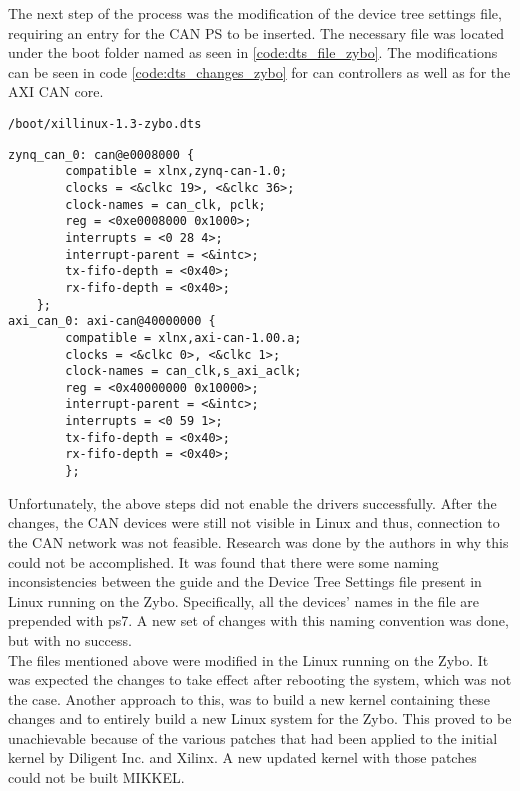 The next step of the process was the modification of the device tree settings file, requiring an entry for the CAN PS to be inserted.
The necessary file was located under the boot folder named as seen in \ref{code:dts_file_zybo}.
The modifications can be seen in code \ref{code:dts_changes_zybo} for can controllers as well as for the AXI CAN core.

\begin{lstlisting}[numbers=none,caption={Device tree settings file and its path.},label={code:dts_file_zybo}]
/boot/xillinux-1.3-zybo.dts
\end{lstlisting}
\begin{lstlisting}[caption={Device tree settings changes.},label={code:dts_changes_zybo}]
zynq_can_0: can@e0008000 {
        compatible = xlnx,zynq-can-1.0;
        clocks = <&clkc 19>, <&clkc 36>;
        clock-names = can_clk, pclk;
        reg = <0xe0008000 0x1000>;
        interrupts = <0 28 4>;
        interrupt-parent = <&intc>;
        tx-fifo-depth = <0x40>;
        rx-fifo-depth = <0x40>;
    };
axi_can_0: axi-can@40000000 {
        compatible = xlnx,axi-can-1.00.a;
        clocks = <&clkc 0>, <&clkc 1>;
        clock-names = can_clk,s_axi_aclk;
        reg = <0x40000000 0x10000>;
        interrupt-parent = <&intc>;
        interrupts = <0 59 1>;
        tx-fifo-depth = <0x40>;
        rx-fifo-depth = <0x40>;
        };
\end{lstlisting}

Unfortunately, the above steps did not enable the drivers successfully.
After the changes, the CAN devices were still not visible in Linux and thus, connection to the CAN network was not feasible.
Research was done by the authors in why this could not be accomplished.
It was found that there were some naming inconsistencies between the guide and the Device Tree Settings file present in Linux running on the Zybo. Specifically, all the devices' names in the file are prepended with ps7.
A new set of changes with this naming convention was done, but with no success.\\

The files mentioned above were modified in the Linux running on the Zybo.
It was expected the changes to take effect after rebooting the system, which was not the case.
Another approach to this, was to build a new kernel containing these changes and to entirely build a new Linux system for the Zybo.
This proved to be unachievable because of the various patches that had been applied to the initial kernel by Diligent Inc. and Xilinx.
A new updated kernel with those patches could not be built MIKKEL.



